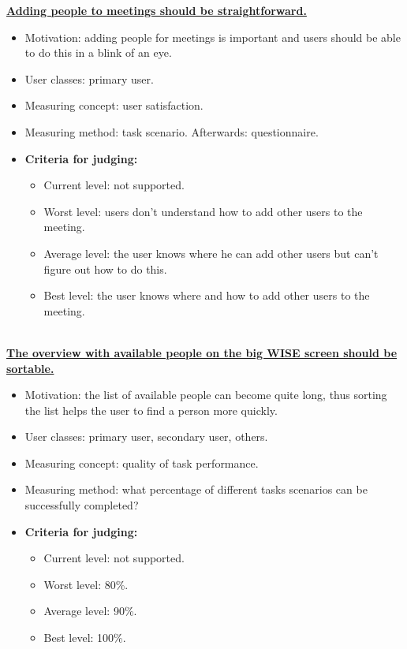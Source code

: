 \documentclass[11pt, a4paper,svglistings]{report}
\begin{document}
\textbf{\underline{Adding people to meetings should be straightforward.}}
\begin{itemize}
\item{Motivation: adding people for meetings is important and users should be able to do this in a blink of an eye.}
\item{User classes: primary user.}
\item{Measuring concept: user satisfaction.}
\item{Measuring method: task scenario. Afterwards: questionnaire.}
\item{\textbf{Criteria for judging:}}
\begin{itemize}
\item{Current level: not supported.}
\item{Worst level: users don't understand how to add other users to the meeting.}
\item{Average level: the user knows where he can add other users but can't figure out how to do this.}
\item{Best level: the user knows where and how to add other users to the meeting. \\ \\}
\end{itemize}
\end{itemize}
\textbf{\underline{The overview with available people on the big WISE screen should be sortable.}}
\begin{itemize}
\item{Motivation: the list of available people can become quite long, thus sorting the list helps the user to find a person more quickly.}
\item{User classes: primary user, secondary user, others.}
\item{Measuring concept: quality of task performance.}
\item{Measuring method:  what percentage of different tasks scenarios can be successfully completed?}
\item{\textbf{Criteria for judging:}}
\begin{itemize}
\item{Current level: not supported.}
\item{Worst level: 80\%.}
\item{Average level: 90\%.}
\item{Best level: 100\%. \\ \\}
\end{itemize}
\end{itemize}
\end{document}
